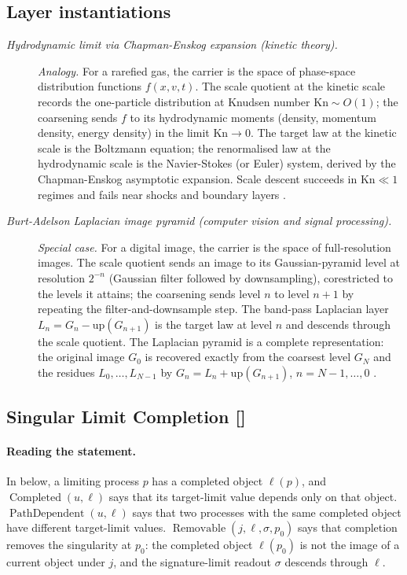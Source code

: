 \subsection*{Layer instantiations}\label{layer-inst:F35}

\begingroup\small
\begin{description}
\item[\emph{Hydrodynamic limit via Chapman-Enskog
expansion (kinetic theory).}] \textit{Analogy.}
For a rarefied gas, the carrier is the space of
phase-space distribution functions \(f(x,v,t)\).  The
scale quotient at the kinetic scale records the
one-particle distribution at Knudsen number
\(\mathrm{Kn}\sim O(1)\); the coarsening sends \(f\)
to its hydrodynamic moments (density, momentum
density, energy density) in the limit
\(\mathrm{Kn}\to 0\).  The target law at the kinetic
scale is the Boltzmann equation; the renormalised law
at the hydrodynamic scale is the Navier-Stokes (or
Euler) system, derived by the Chapman-Enskog
asymptotic expansion.  Scale descent succeeds in
\(\mathrm{Kn}\ll 1\) regimes and fails near shocks
and boundary layers \citep{Cercignani1988Boltzmann}.

\item[\emph{Burt-Adelson Laplacian image pyramid
(computer vision and signal processing).}] \textit{Special case.}
For a digital image, the carrier is the space of
full-resolution images.  The scale quotient
sends an image to its Gaussian-pyramid level at
resolution \(2^{-n}\) (Gaussian filter followed by
downsampling), corestricted to the levels it attains; the coarsening sends level \(n\) to
level \(n+1\) by repeating the filter-and-downsample
step.  The band-pass Laplacian layer
\(L_n=G_n-\mathrm{up}(G_{n+1})\) is the target law at
level \(n\) and descends through the scale quotient.
The Laplacian pyramid is a complete representation:
the original image \(G_0\) is recovered exactly from the coarsest level \(G_N\) and the residues \(L_0,\dots,L_{N-1}\) by \(G_n=L_n+\mathrm{up}(G_{n+1})\), \(n=N-1,\dots,0\)
\citep{BurtAdelson1983LaplacianPyramid}.

\end{description}
\endgroup


\subsection{Singular Limit Completion [\texorpdfstring{}{F36}]}\label{sec:self-reference-limits:singular-limit}

\paragraph{Reading the statement.} In  below, a
limiting process \(p\) has a completed object \(\ell(p)\), and
\(\operatorname{Completed}(u,\ell)\) says that its target-limit value
depends only on that object.  \(\operatorname{PathDependent}(u,\ell)\)
says that two processes with the same completed object have different
target-limit values.  \(\operatorname{Removable}(j,\ell,\sigma,p_0)\)
says that completion removes the singularity at \(p_0\): the completed
object \(\ell(p_0)\) is not the image of a current object under \(j\),
and the signature-limit readout \(\sigma\) descends through \(\ell\).


